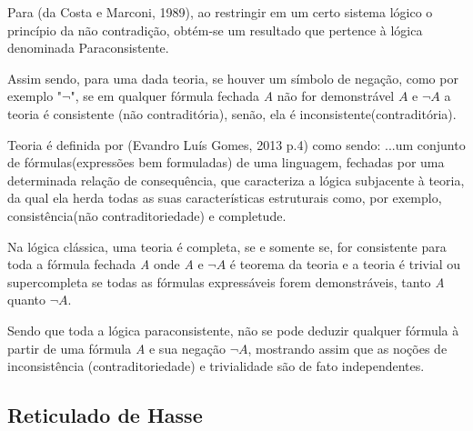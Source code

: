 Para (da Costa e Marconi, 1989), ao restringir em um certo sistema lógico o princípio da não contradição, obtém-se um resultado que pertence à lógica denominada Paraconsistente.


Assim sendo, para uma dada teoria, se houver um símbolo de negação, como por exemplo "\emph{$\neg $}", se em qualquer fórmula fechada \emph{A} não for demonstrável \emph{$A$} e \emph{$\neg A $} a teoria é consistente (não contraditória), senão, ela é inconsistente(contraditória).


Teoria é definida por (Evandro Luís Gomes, 2013 p.4) como sendo:
\citacao
{
...um conjunto de fórmulas(expressões bem formuladas) de uma linguagem, fechadas por uma determinada relação de consequência, que caracteriza a lógica subjacente à teoria, da qual ela herda todas as suas características estruturais como, por exemplo, consistência(não contraditoriedade) e completude.
}

Na lógica clássica, uma teoria é completa, se e somente se, for consistente para toda a fórmula fechada \emph{A} onde \emph{A} e \emph{$\neg A$} é teorema da teoria e a teoria é trivial ou supercompleta se todas as fórmulas expressáveis forem demonstráveis, tanto \emph{A} quanto \emph{$ \neg A$}.


Sendo que toda a lógica paraconsistente, não se pode deduzir qualquer fórmula à partir de uma fórmula \emph{A} e sua negação \emph{$\neg A$}, mostrando assim que as noções de inconsistência (contraditoriedade) e trivialidade são de fato independentes.







\subsection{Reticulado de Hasse}

